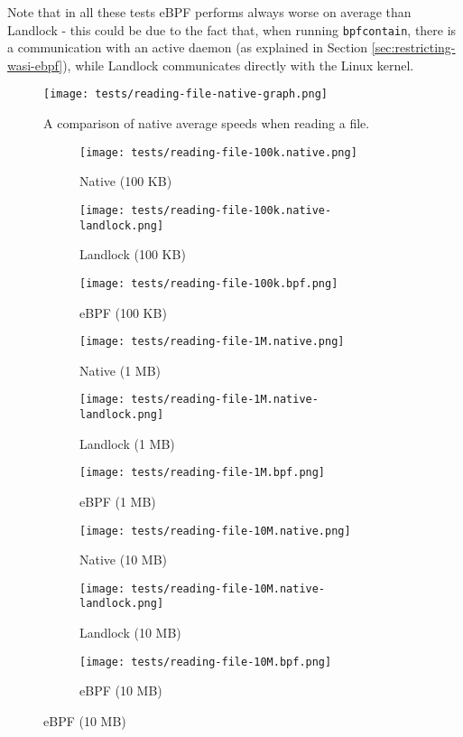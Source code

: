 Note that in all these tests eBPF performs always worse on average than Landlock - this could be
due to the fact that, when running \texttt{bpfcontain}, there is a communication with an active daemon
(as explained in Section \ref{sec:restricting-wasi-ebpf}), while Landlock communicates directly with
the Linux kernel.

\begin{figure}[h]
  \centering
  \texttt{[image: tests/reading-file-native-graph.png]}
  \caption{A comparison of native average speeds when reading a file.}
  \label{fig:avg-comparison-native-speed}
\end{figure}

\begin{figure}[ht!]
  \centering
  \begin{subfigure}[b]{0.32\textwidth}
    \centering
    \texttt{[image: tests/reading-file-100k.native.png]}
    \caption{Native (100 KB)}
  \end{subfigure}
  \begin{subfigure}[b]{0.32\textwidth}
    \centering
    \texttt{[image: tests/reading-file-100k.native-landlock.png]}
    \caption{Landlock (100 KB)}
  \end{subfigure}
  \begin{subfigure}[b]{0.32\textwidth}
    \centering
    \texttt{[image: tests/reading-file-100k.bpf.png]}
    \caption{eBPF (100 KB)}
  \end{subfigure}

  \begin{subfigure}[b]{0.32\textwidth}
    \centering
    \texttt{[image: tests/reading-file-1M.native.png]}
    \caption{Native (1 MB)}
  \end{subfigure}
  \begin{subfigure}[b]{0.32\textwidth}
    \centering
    \texttt{[image: tests/reading-file-1M.native-landlock.png]}
    \caption{Landlock (1 MB)}
  \end{subfigure}
  \begin{subfigure}[b]{0.32\textwidth}
    \centering
    \texttt{[image: tests/reading-file-1M.bpf.png]}
    \caption{eBPF (1 MB)}
  \end{subfigure}

  \begin{subfigure}[b]{0.32\textwidth}
    \centering
    \texttt{[image: tests/reading-file-10M.native.png]}
    \caption{Native (10 MB)}
  \end{subfigure}
  \begin{subfigure}[b]{0.32\textwidth}
    \centering
    \texttt{[image: tests/reading-file-10M.native-landlock.png]}
    \caption{Landlock (10 MB)}
  \end{subfigure}
  \begin{subfigure}[b]{0.32\textwidth}
    \centering
    \texttt{[image: tests/reading-file-10M.bpf.png]}
    \caption{eBPF (10 MB)}
  \end{subfigure}


\end{figure}
